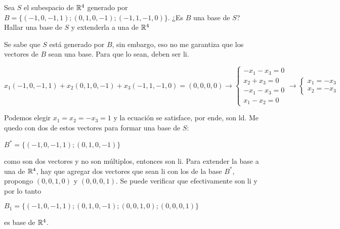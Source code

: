 \item Sea $S$ el subespacio de $\mathbb{R}^4$ generado por $B=\{(-1,0,-1,1);(0,1,0,-1);(-1,1,-1,0)\}$. ¿Es $B$ una base de $S$? Hallar una base de $S$ y extenderla a una de $\mathbb{R}^4$
    \begin{mdframed}[style=s]
        Se sabe que $S$ está generado por $B$, sin embargo, eso no me garantiza que los vectores de $B$ sean una base. Para que lo sean, deben ser li.
        \begin{center}
            $x_1(-1,0,-1,1)+x_2(0,1,0,-1)+x_3(-1,1,-1,0)=(0,0,0,0)\to \begin{cases}
                -x_1-x_3=0\\
                x_2+x_3=0\\
                -x_1-x_3=0\\
                x_1-x_2=0
            \end{cases}\to\begin{cases}
                x_1=-x_3\\
                x_2=-x_3
            \end{cases}$
        \end{center}
        Podemos elegir $x_1=x_2=-x_3=1$ y la ecuación se satisface, por ende, son ld. Me quedo con dos de estos vectores para formar una base de $S$:
        \begin{center}
            $B^*=\{(-1,0,-1,1);(0,1,0,-1)\}$
        \end{center}
        como son dos vectores y no son múltiplos, entonces son li. Para extender la base a una de $\mathbb{R}^4$, hay que agregar dos vectores que sean li con los de la base $B^*$, propongo $(0,0,1,0)$ y $(0,0,0,1)$. Se puede verificar que efectivamente son li y por lo tanto 
        \begin{center}
            $B_1=\{(-1,0,-1,1);(0,1,0,-1);(0,0,1,0);(0,0,0,1)\}$    
        \end{center}
        es base de $\mathbb{R}^4$.
    \end{mdframed}